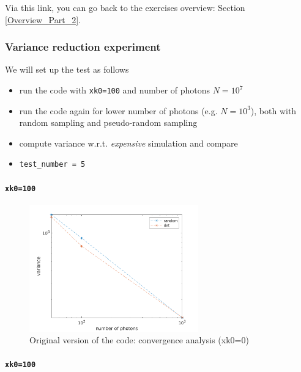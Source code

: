 \documentclass[../main/main.tex]{subfiles}
\begin{document}
Via this link, you can go back to the exercises overview: Section \underline{\ref{Overview_Part_2}}.


\newpage
\subsubsection{Variance reduction experiment}
\label{variance_reduction_experiment}

We will set up the test as follows
\begin{itemize}
\item run the code with \texttt{xk0=100} and number of photons $N=10^7$
\item run the code again for lower number of photons (e.g. $N=10^3$), both with random sampling and pseudo-random sampling
\item compute variance w.r.t. \textit{expensive} simulation and compare
\item \texttt{test\_number = 5}
\end{itemize}


\paragraph{\texttt{xk0=100}}
\begin{figure}[!htp]
\centering
\includegraphics[width=0.65\textwidth]{../../introductory_exercises/P_Cygni_profile_UV_resonance/data/variance_reduction_test.png}
\caption{Original version of the code: convergence analysis (xk0=0)}
\label{variance_reduction_test}
\end{figure}

\paragraph{\texttt{xk0=100}}


\noindent{}
\end{document}
